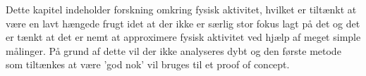 Dette kapitel indeholder forskning omkring fysisk aktivitet, hvilket er tiltænkt at være en lavt hængede frugt idet at der ikke er særlig stor fokus lagt på det og det er tænkt at det er nemt at approximere fysisk aktivitet ved hjælp af meget simple målinger.
På grund af dette vil der ikke analyseres dybt og den første metode som tiltænkes at være 'god nok' vil bruges til et proof of concept.